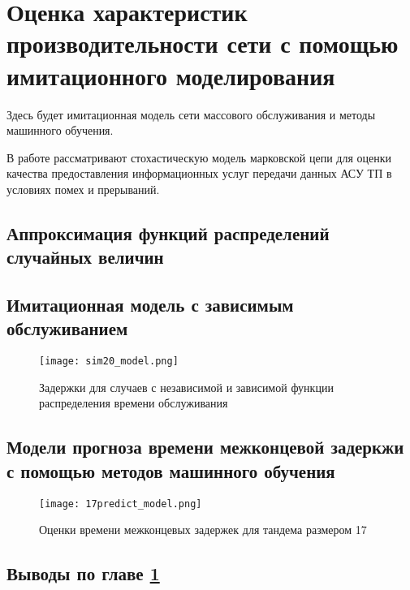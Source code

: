 \chapter{Оценка характеристик производительности сети с помощью имитационного моделирования}\label{prediction_model}
Здесь будет имитационная модель сети массового обслуживания и методы машинного обучения.


В работе \cite{Eremenko2013} рассматривают стохастическую модель марковской цепи для оценки качества предоставления информационных услуг передачи данных АСУ ТП в условиях помех и прерываний.

\section{Аппроксимация функций распределений случайных величин}
\section{Имитационная модель с зависимым обслуживанием}
\begin{figure}[h!]
  \centering
   \texttt{[image: sim20\_model.png]}
\caption{Задержки для случаев с независимой и зависимой функции распределения времени обслуживания}
\label{fig:sim20_model}
\end{figure}

\section{Модели прогноза времени межконцевой задеркжи с помощью методов машинного обучения}
\begin{figure}[h!]
    \centering
     \texttt{[image: 17predict\_model.png]}
  \caption{Оценки времени межконцевых задержек для тандема размером 17}
  \label{fig:17predict_model}
\end{figure}

\section{Выводы по главе \cref{prediction_model}}



